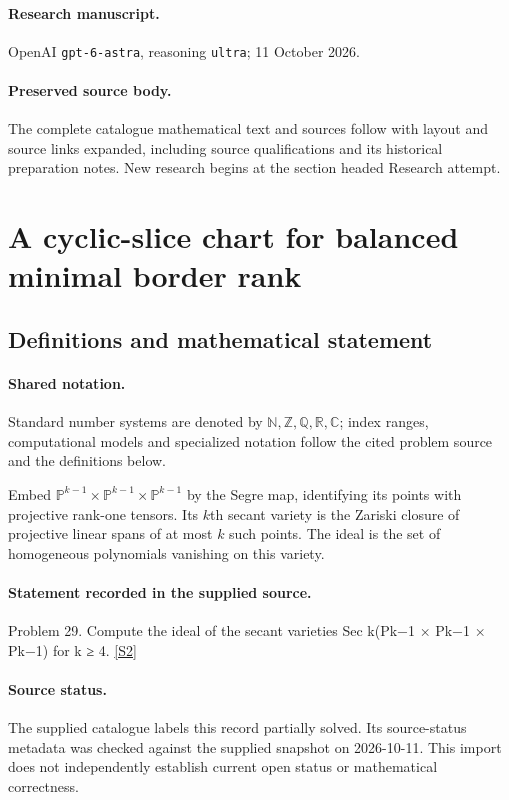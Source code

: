 \documentclass[11pt]{article}
\begin{document}
\paragraph{Research manuscript.} OpenAI \texttt{gpt-6-astra}, reasoning \texttt{ultra}; 11 October 2026.
\paragraph{Preserved source body.} The complete catalogue mathematical text and sources follow with layout and source links expanded, including source qualifications and its historical preparation notes. New research begins at the section headed Research attempt.

\section{A cyclic-slice chart for balanced minimal border rank}\label{statement}

\subsection{Definitions and mathematical statement}

\paragraph{Shared notation.}Standard number systems are denoted by $\mathbb N,\mathbb Z,\mathbb Q,\mathbb R,\mathbb C$; index ranges, computational models and specialized notation follow the cited problem source and the definitions below.


Embed $\mathbb P^{k-1}\times\mathbb P^{k-1}\times\mathbb P^{k-1}$ by the Segre map, identifying its points with projective rank-one tensors. Its $k$th secant variety is the Zariski closure of projective linear spans of at most $k$ such points. The ideal is the set of homogeneous polynomials vanishing on this variety.
\paragraph{Statement recorded in the supplied source.}
Problem 29. Compute the ideal of the secant varieties Sec k(Pk−1 × Pk−1 × Pk−1) for k ≥ 4. \href{https://aimath.org/WWN/compalgstat/compalgstat.pdf}{[S2]}
\paragraph{Source status.}
The supplied catalogue labels this record partially solved. Its source-status metadata was checked against the supplied snapshot on 2026-10-11. This import does not independently establish current open status or mathematical correctness.
\end{document}
